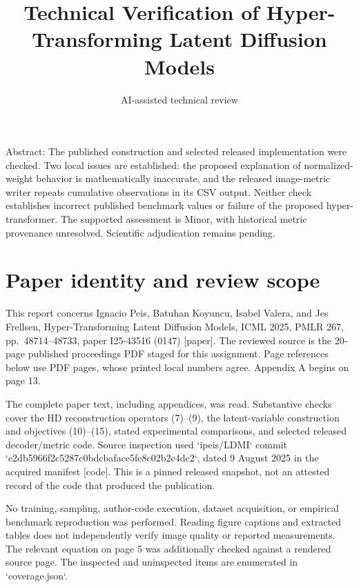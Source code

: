 \documentclass[10pt]{article}
\title{Technical Verification of
Hyper-Transforming Latent Diffusion Models}
\author{AI-assisted technical review}
\date{}
\begin{document}
\maketitle
Abstract: The published construction and selected released implementation were checked. Two local issues are established: the proposed explanation of normalized-weight behavior is mathematically inaccurate, and the released image-metric writer repeats cumulative observations in its CSV output. Neither check establishes incorrect published benchmark values or failure of the proposed hyper-transformer. The supported assessment is Minor, with historical metric provenance unresolved. Scientific adjudication remains pending.\par
\section*{Paper identity and review scope}
This report concerns Ignacio Peis, Batuhan Koyuncu, Isabel Valera, and Jes Frellsen, Hyper-Transforming Latent Diffusion Models, ICML 2025, PMLR 267, pp. 48714–48733, paper I25-43516 (0147) [paper]. The reviewed source is the 20-page published proceedings PDF staged for this assignment. Page references below use PDF pages, whose printed local numbers agree. Appendix A begins on page 13.\par
The complete paper text, including appendices, was read. Substantive checks cover the HD reconstruction operators (7)–(9), the latent-variable construction and objectives (10)–(15), stated experimental comparisons, and selected released decoder/metric code. Source inspection used `ipeis/LDMI` commit `e2db5966f2c5287c0bdcbaface5fe8c02b2c4dc2`, dated 9 August 2025 in the acquired manifest [code]. This is a pinned released snapshot, not an attested record of the code that produced the publication.\par
No training, sampling, author-code execution, dataset acquisition, or empirical benchmark reproduction was performed. Reading figure captions and extracted tables does not independently verify image quality or reported measurements. The relevant equation on page 5 was additionally checked against a rendered source page. The inspected and uninspected items are enumerated in `coverage.json`.\par
\end{document}
